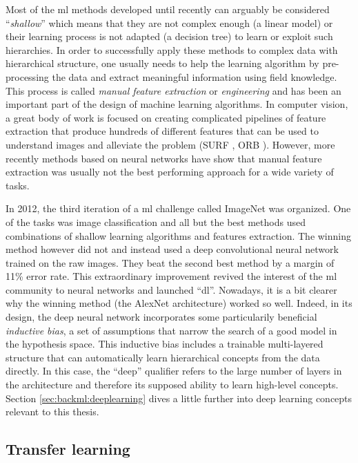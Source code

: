 Most of the \acrlong{ml} methods developed until recently can arguably be considered ``\textit{shallow}'' which means that they are not complex enough (\eg a linear model) or their learning process is not adapted (\eg a decision tree) to learn or exploit such hierarchies. In order to successfully apply these methods to complex data with hierarchical structure, one usually needs to help the learning algorithm by pre-processing the data and extract meaningful information using field knowledge. This process is called \textit{manual feature extraction} or \textit{engineering} and has been an important part of the design of machine learning algorithms. In computer vision, a great body of work is focused on creating complicated pipelines of feature extraction that produce hundreds of different features that can be used to understand images and alleviate the problem (\eg SURF \parencite{bay2006surf}, ORB \parencite{rublee2011orb}). However, more recently methods based on neural networks have show that manual feature extraction was usually not the best performing approach for a wide variety of tasks.

In 2012, the third iteration of a \acrlong{ml} challenge called ImageNet \parencite{russakovsky2015imagenet} was organized. One of the tasks was image classification and all but the best methods used combinations of shallow learning algorithms and features extraction. The winning method \parencite{krizhevsky2012imagenet} however did not and instead used a deep convolutional neural network trained on the raw images. They beat the second best method by a margin of 11\% error rate. This extraordinary improvement revived the interest of the \acrlong{ml} community to neural networks and launched ``\acrlong{dl}''. Nowadays, it is a bit clearer why the winning method (\ie the AlexNet architecture) worked so well. Indeed, in its design, the deep neural network incorporates some particularily beneficial \textit{inductive bias}, a set of assumptions that narrow the search of a good model in the hypothesis space. This inductive bias includes a trainable multi-layered structure that can automatically learn hierarchical concepts from the data directly. In this case, the ``deep'' qualifier refers to the large number of layers in the architecture and therefore its supposed ability to learn high-level concepts. Section \ref{sec:backml:deeplearning} dives a little further into deep learning concepts relevant to this thesis.

\subsection{Transfer learning}
\label{ssec:backml:transfer}

